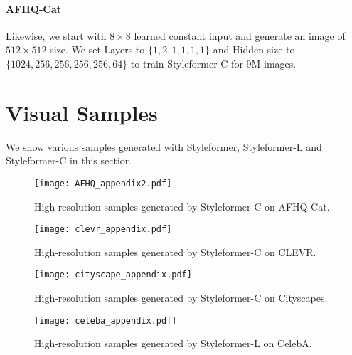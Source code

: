 \documentclass[10pt,twocolumn,letterpaper]{article}
\begin{document}
\paragraph{AFHQ-Cat}
Likewise, we start with $8 \times 8$ learned constant input and generate an image of $512 \times 512$ size. We set Layers to $\{1,2,1,1,1,1\}$ and Hidden size to $\{1024,256,256,256,256,64\}$ to train Styleformer-C for 9M images. 



\section{Visual Samples}
We show various samples generated with Styleformer, Styleformer-L and Styleformer-C in this section.
\label{app:G}


\begin{figure*}[t]
\begin{center}
\texttt{[image: AFHQ\_appendix2.pdf]}
\end{center}
\vspace{-5mm}
\caption{High-resolution samples generated by Styleformer-C on AFHQ-Cat.
}
\vspace{-3mm}
\label{fig:afhq_app}
\end{figure*}

\begin{figure*}[t]
\begin{center}
\texttt{[image: clevr\_appendix.pdf]}
\end{center}
\vspace{-5mm}
\caption{High-resolution samples generated by Styleformer-C on CLEVR.
}
\vspace{-3mm}
\label{fig:clevr_app}
\end{figure*}



\begin{figure*}[t]
\begin{center}
\texttt{[image: cityscape\_appendix.pdf]}
\end{center}
\vspace{-5mm}
\caption{High-resolution samples generated by Styleformer-C on Cityscapes.
}
\vspace{-3mm}
\label{fig:cityscape_app}
\end{figure*}


\begin{figure*}[t]
\begin{center}
\texttt{[image: celeba\_appendix.pdf]}
\end{center}
\vspace{-5mm}
\caption{High-resolution samples generated by Styleformer-L on CelebA.
}
\vspace{-3mm}
\label{fig:celeba_app}
\end{figure*}
\end{document}
